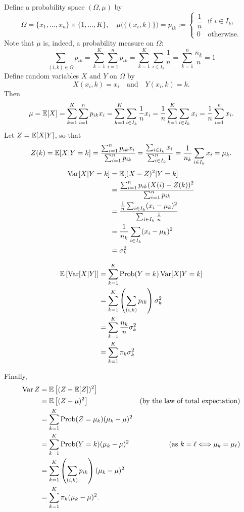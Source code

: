 \documentclass[12pt]{amsart}
\begin{document}
    Define a probability space $(\Omega, \mu)$ by
    \[
        \Omega = \{x_1,\ldots,x_n\}\times \{1,\ldots,K\},\quad
        \mu\big(\{(x_i, k)\}\big)= p_{ik} := \begin{cases}
            \dfrac1n&\text{if $i\in I_k$,}\\[2ex]
            0&\text{otherwise.}
        \end{cases}
    \]
    Note that $\mu$ is, indeed, a probability measure on $\Omega$:
    \[
        \sum_{(i, k)\in\Omega} p_{ik} =\sum_{k=1}^K\sum_{i=1}^n p_{ik}
        = \sum_{k=1}^K\sum_{i\in I_k}\frac1n = \sum_{k=1}^n\frac{n_k}n = 1
    \]
    Define random variables $X$ and $Y$ on $\Omega$ by
    \[
        X(x_i, k) = x_i\quad\text{and}\quad Y(x_i, k) = k.
    \]
    Then
    \[
        \mu = \operatorname{\mathbb{E}}[X] = \sum_{k=1}^K\sum_{i=1}^n p_{ik}x_i
        = \sum_{k=1}^K\sum_{i\in I_k}\frac1n x_i
        = \frac1n\sum_{k=1}^K\sum_{i\in I_k} x_i = \frac1n\sum_{i=1}^n x_i.
    \]
    Let $Z=\operatorname{\mathbb{E}}[X|Y]$, so that
    \[
        Z(k) = \operatorname{\mathbb{E}}[X|Y = k]
        = \frac{\sum_{i=1}^np_{ik}x_i}{\sum_{i=1}^np_{ik}}
        = \frac{\sum_{i\in I_k}x_i}{\sum_{i\in I_k}^n1}
        = \frac1{n_k}\sum_{i\in I_k}x_i = \mu_k.
    \]
    \begin{align*}
        \operatorname{Var}[X|Y=k] &= \operatorname{\mathbb{E}}[(X - Z)^2|Y=k]\\
        &= \frac{\sum_{i=1}^np_{ik}(X(i) - Z(k))^2}{\sum_{i=1}^n p_{ik}}\\
        &= \frac{\frac1n\sum_{i\in I_k}(x_i - \mu_k)^2}{\sum_{i\in I_k} \frac1n}\\
        &= \frac1{n_k}\sum_{i\in I_k}(x_i - \mu_k)^2\\
        &= \sigma_k^2
    \end{align*}

    \begin{align*}
        \operatorname{\mathbb{E}}\left[\operatorname{Var}[X|Y]\right] &= \sum_{k=1}^K\operatorname{Prob}(Y=k)\operatorname{Var}[X|Y=k]\\
        &=\sum_{k=1}^K\left(\sum_{(i,k)}p_{ik}\right)\sigma_k^2\\
        &=\sum_{k=1}^K\frac{n_k}n\sigma_k^2\\
        &=\sum_{k=1}^K\pi_k\sigma_k^2
    \end{align*}
    
    Finally,
    \begin{align*}
        \operatorname{Var} Z &= \operatorname{\mathbb{E}}\left[(Z - \operatorname{\mathbb{E}}[Z])^2\right]\\
        &= \operatorname{\mathbb{E}}\left[(Z - \mu)^2\right] &\text{(by the law of total expectation)}\\
        &= \sum_{k=1}^K\operatorname{Prob}(Z=\mu_k)(\mu_k - \mu)^2\\
        &= \sum_{k=1}^K\operatorname{Prob}(Y=k)(\mu_k - \mu)^2&\text{(as $k= \ell \Longleftrightarrow \mu_k= \mu_\ell$)} \\
        &= \sum_{k=1}^K\left(\sum_{(i, k)}p_{ik}\right)(\mu_k - \mu)^2\\
        &= \sum_{k=1}^K\pi_k(\mu_k - \mu)^2.
    \end{align*}
\end{document}
